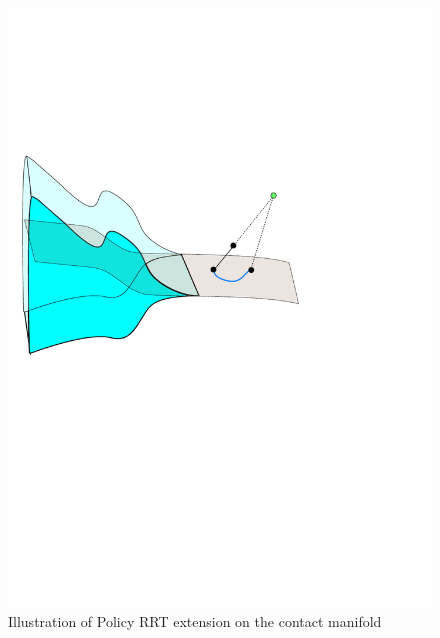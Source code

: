 \documentclass[../thesis.tex]{subfiles}
\begin{document}


\begin{figure}
  \centering
  \includegraphics[width=.5\linewidth]{./Planning/extend.pdf}
  
  \caption{Illustration of Policy RRT extension on the contact manifold}
  \label{fig:extend}
\end{figure}




\end{document}
